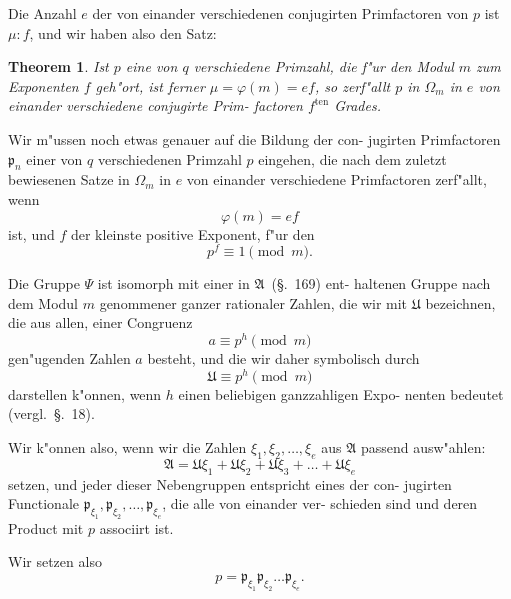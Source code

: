 \documentclass[12pt,a4paper]{article}
\theoremstyle{weber}
\newtheorem*{theorem}{Theorem}
\begin{document}
Die Anzahl $e$ der von einander verschiedenen conjugirten
Primfactoren von $p$ ist $\mu : f$, und wir haben also den Satz:

\begin{theorem}
Ist $p$ eine von $q$ verschiedene Primzahl, die f"ur
den Modul $m$ zum Exponenten $f$ geh"ort, ist
ferner $\mu = \varphi(m) = ef$, so zerf"allt $p$ in $\varOmega_m$ in $e$
von einander verschiedene conjugirte Prim-
factoren $f^{\mathrm{ten}}$ Grades.
\end{theorem}

\newpage
Wir m"ussen noch etwas genauer auf die Bildung der con-
jugirten Primfactoren $\mathfrak{p}_n$ einer von $q$ verschiedenen Primzahl $p$
eingehen, die nach dem zuletzt bewiesenen Satze in $\varOmega_m$ in $e$ von
einander verschiedene Primfactoren zerf"allt, wenn
\begin{equation}\label{eq:s172-1}
\varphi(m) = ef
\end{equation}
ist, und $f$ der kleinste positive Exponent, f"ur den
\begin{equation}\label{eq:s172-2}
p^f \equiv 1 \pmod{m}.
\end{equation}

Die Gruppe $\varPsi$ ist isomorph mit einer in $\mathfrak{A}$~(\S.~169) ent-
haltenen Gruppe nach dem Modul $m$ genommener ganzer
rationaler Zahlen, die wir mit $\mathfrak{U}$ bezeichnen, die aus allen, einer
Congruenz
\begin{equation}\label{eq:s172-3b}
a \equiv p^h \pmod{m}
\end{equation}
gen"ugenden Zahlen $a$ besteht, und die wir daher symbolisch durch
\begin{equation}\label{eq:s172-4b}
\mathfrak{U} \equiv p^h \pmod{m}
\end{equation}
darstellen k"onnen, wenn $h$ einen beliebigen ganzzahligen Expo-
nenten bedeutet (vergl.\ \S.~18).

Wir k"onnen also, wenn wir die Zahlen $\xi_1, \xi_2, \dots, \xi_e$ aus $\mathfrak{A}$
passend ausw"ahlen:
\begin{equation}\label{eq:s172-5}
\mathfrak{A} = \mathfrak{U}\xi_1 + \mathfrak{U}\xi_2 + \mathfrak{U}\xi_3 + \dots + \mathfrak{U}\xi_e
\end{equation}
setzen, und jeder dieser Nebengruppen entspricht eines der con-
jugirten Functionale $\mathfrak{p}_{\xi_1}, \mathfrak{p}_{\xi_2}, \dots, \mathfrak{p}_{\xi_e}$, die alle von einander ver-
schieden sind und deren Product mit $p$ associirt ist.

Wir setzen also
\begin{equation}\label{eq:s172-6b}
p = \mathfrak{p}_{\xi_1}\mathfrak{p}_{\xi_2}\dots\mathfrak{p}_{\xi_e}.
\end{equation}
\end{document}
